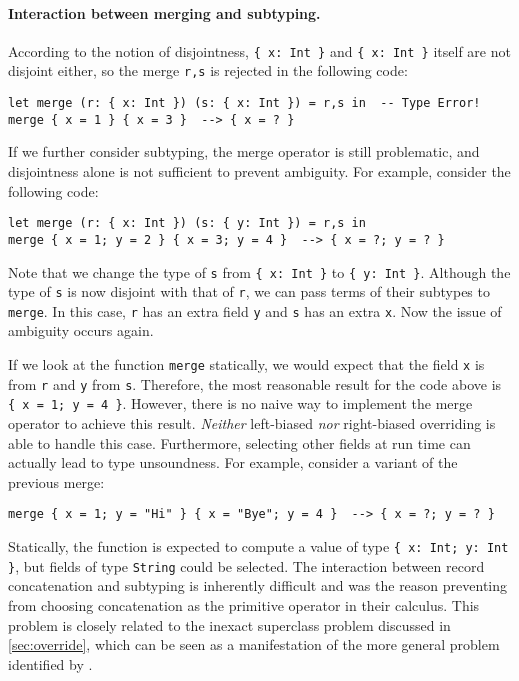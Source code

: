 \paragraph{Interaction between merging and subtyping.}
According to the notion of disjointness, \lstinline|{ x: Int }| and
\lstinline|{ x: Int }| itself are not disjoint either, so the merge
\lstinline{r,s} is rejected in the following code:
\begin{lstlisting}
let merge (r: { x: Int }) (s: { x: Int }) = r,s in  -- Type Error!
merge { x = 1 } { x = 3 }  --> { x = ? }
\end{lstlisting}
If we further consider subtyping, the merge operator is still problematic, and
disjointness alone is not sufficient to prevent ambiguity. For example, consider
the following code:
\begin{lstlisting}
let merge (r: { x: Int }) (s: { y: Int }) = r,s in
merge { x = 1; y = 2 } { x = 3; y = 4 }  --> { x = ?; y = ? }
\end{lstlisting}
Note that we change the type of \lstinline{s} from \lstinline|{ x: Int }| to
\lstinline|{ y: Int }|. Although the type of \lstinline{s} is now disjoint with
that of \lstinline{r}, we can pass terms of their subtypes to \lstinline{merge}.
In this case, \lstinline{r} has an extra field \lstinline{y} and \lstinline{s}
has an extra \lstinline{x}. Now the issue of ambiguity occurs again.

If we look at the function \lstinline{merge} statically, we would expect that
the field \lstinline{x} is from \lstinline{r} and \lstinline{y} from
\lstinline{s}. Therefore, the most reasonable result for the code above is
\lstinline|{ x = 1; y = 4 }|. However, there is no naive way to implement the
merge operator to achieve this result. \emph{Neither} left-biased \emph{nor}
right-biased overriding is able to handle this case. Furthermore, selecting
other fields at run time can actually lead to type unsoundness. For example,
consider a variant of the previous merge:
\begin{lstlisting}
merge { x = 1; y = "Hi" } { x = "Bye"; y = 4 }  --> { x = ?; y = ? }
\end{lstlisting}
Statically, the function is expected to compute a value of type
\lstinline|{ x: Int; y: Int }|, but fields of type \lstinline{String} could be
selected. The interaction between record concatenation and subtyping is
inherently difficult and was the reason preventing
\citet{cardelli1991operations} from choosing concatenation as the primitive
operator in their calculus. This problem is closely related to the inexact
superclass problem discussed in \autoref{sec:override}, which can be seen as a
manifestation of the more general problem identified by
\citeauthor{cardelli1991operations}.

